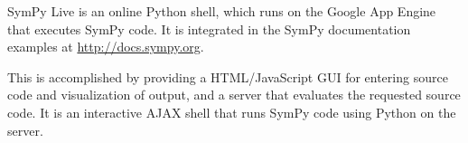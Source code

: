 SymPy Live is an online Python shell, which runs on the Google
App Engine that executes SymPy code. It is integrated in the SymPy
documentation examples at \href{http://docs.sympy.org}{http://docs.sympy.org}.

This is accomplished by providing a HTML/JavaScript GUI for entering
source code and visualization of output, and a server that
evaluates the requested source code. It is an interactive AJAX shell
that runs SymPy code using Python on the server.
